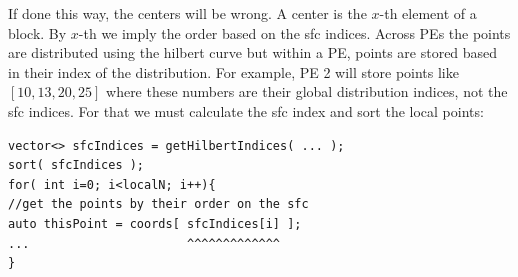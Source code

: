 \documentclass[a4paper,10pt]{article}
\begin{document}
If done this way, the centers will be wrong. A center is the $x$-th element of a block. By $x$-th
we imply the order based on the sfc indices. Across PEs the points are distributed using the 
hilbert curve but within a PE, points are stored based in their index of the distribution.
For example, PE 2 will store points like $[10,13,20,25]$ where these numbers are their global
distribution indices, not the sfc indices. For that we must calculate the sfc index and sort 
the local points:
\begin{verbatim}
vector<> sfcIndices = getHilbertIndices( ... );
sort( sfcIndices );
for( int i=0; i<localN; i++){
//get the points by their order on the sfc
auto thisPoint = coords[ sfcIndices[i] ]; 
...                      ^^^^^^^^^^^^^
}
\end{verbatim}
\end{document}
